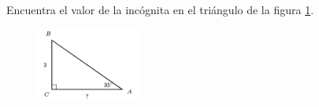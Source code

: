 \question[15]  Encuentra el valor de la incógnita en el triángulo de la figura \ref{fig:lados_functrig_27}.
\begin{figure}[H]
    \begin{center}
        \includegraphics[width=0.3\textwidth]{../images/lados_functrig_27.png}
    \end{center}
    \caption{}
    \label{fig:lados_functrig_27}
\end{figure}